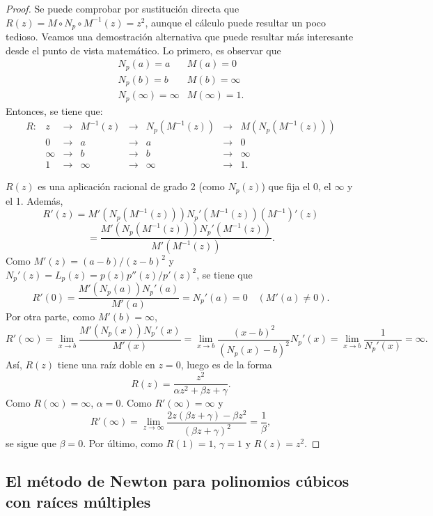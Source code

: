 \begin{proof}
Se puede comprobar por sustitución directa que $R(z)=M\circ N_p\circ M^{-1}(z)=z^2$, aunque el cálculo puede resultar un poco tedioso. Veamos una demostración alternativa que puede resultar más interesante desde el punto de vista matemático. Lo primero, es observar que
\[
\left.
\begin{array}{ll}
N_p(a)=a  &   M(a)=0   \\
N_p(b)=b  &   M(b)=\infty\\
 N_p(\infty)=\infty  &   M(\infty)=1.
\end{array}
\right.
\]
Entonces, se tiene que:
\[
\left.
\begin{array}{cccccccc}
R: & z & \to & M^{-1}(z) &\to & N_p(M^{-1}(z)) & \to & M(N_p(M^{-1}(z))) \\
 & 0 & \to & a &\to & a & \to & 0 \\
  & \infty & \to & b &\to & b & \to & \infty \\
   & 1 & \to & \infty &\to & \infty & \to & 1.
\end{array}
\right.
\]

$R(z)$ es una aplicación racional de grado 2 (como $N_p(z)$) que fija el 0, el $\infty$ y el 1. Además,
$$
R'(z)=M'(N_p(M^{-1}(z))) N_p'(M^{-1}(z)) (M^{-1})'(z)
$$
$$
=
\frac{M'(N_p(M^{-1}(z))) N_p'(M^{-1}(z))}{M'(M^{-1}(z))}.
$$
Como $M'(z)=(a-b)/(z-b)^2$ y $N_p'(z)=L_p(z)=p(z)p''(z)/p'(z)^2$, se tiene que
$$
R'(0)=
\frac{M'(N_p(a)) N_p'(a)}{M'(a)}=N_p'(a)=0 \quad (M'(a)\ne 0).
$$
Por otra parte, como $M'(b)=\infty$,
$$
R'(\infty)=
\lim_{x\to b}\frac{M'(N_p(x)) N_p'(x)}{M'(x)}=\lim_{x\to b}\frac{(x-b)^2}{(N_p(x)-b)^2} N_p'(x)= \lim_{x\to b}\frac{1}{N_p'(x)} =\infty.
$$
Así, $R(z)$ tiene una raíz doble en $z=0$, luego es de la forma
$$
R(z)=\frac{z^2}{\alpha z^2+\beta z+\gamma}.
$$
Como $R(\infty)=\infty$, $\alpha=0$. Como $R'(\infty)=\infty$ y
$$
R'(\infty)=\lim_{z\to \infty}\frac{2z(\beta z+\gamma)-\beta z^2}{(\beta z+\gamma)^2}=\frac{1}{\beta},
$$
se sigue que $\beta=0$. Por último, como $R(1)=1$, $\gamma=1$ y $R(z)=z^2$.
\end{proof}



\subsection{El método de Newton para polinomios cúbicos con raíces múltiples} 

